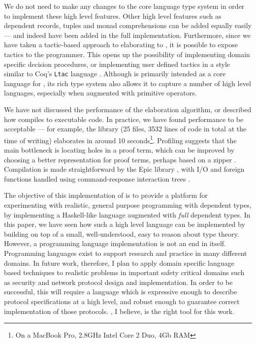 We do not need to make any changes to the core language type system in order to 
implement these high level features. 
Other high level features such as dependent records, tuples and monad comprehensions
can be added equally easily --- and indeed have been added in the full implementation.  
Furthermore, 
since we have taken a tactic-based approach to elaborating \Idris{} to \TT{},
it is possible to expose tactics to the programmer. This opens up
the possibility of implementing domain specific decision procedures, or
implementing user defined tactics in a style similar to Coq's \texttt{Ltac}
language \cite{Delahaye2000}.  Although \TT{} is primarily intended as a core
language for \Idris{}, its rich type system also allows it to capture a number
of high level languages, especially when augmented with primitive operators. 

We have not discussed the performance of the elaboration
algorithm, or described how \Idris{} compiles to executable code. In practice,
we have found performance to be acceptable --- for example, the \Idris{}
library (25 files, 3532 lines of code in total at the time of writing)
elaborates in around 10 seconds\footnote{On a MacBook Pro, 2.8GHz Intel Core 2
Duo, 4Gb RAM}. Profiling suggests that the main bottleneck is locating holes
in a proof term, which can be improved by choosing a better representation
for proof terms, perhaps based on a zipper \cite{Huet1997}. Compilation is made
straightforward by the Epic library \cite{brady2011epic}, with I/O and foreign
functions handled using command-response interaction trees \cite{Hancock2000}.

The objective of this implementation of \Idris{} is to provide a platform
for experimenting with realistic, general purpose programming with dependent
types, by implementing a Haskell-like language augmented with \emph{full}
dependent types. 
In this paper, we have seen how such a high level language can be implemented
by building on top of a small, well-understood, easy to reason about type
theory. 
However, a programming language implementation is not an end in itself. 
Programming languages exist to support research and practice in many different
domains. In future work, therefore, I plan to apply domain specific
language based techniques to realistic problems in important safety critical
domains such as security and network protocol design and implementation. In
order to be successful, this will require a language which is expressive enough
to describe protocol specifications at a high level, and robust enough to
guarantee correct implementation of those protocols. \Idris{}, I believe, is
the right tool for this work.

